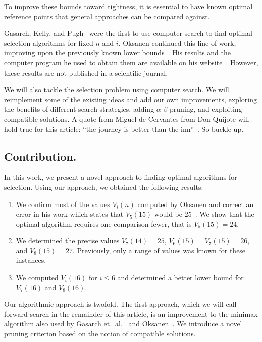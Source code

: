 \documentclass[a4paper,UKenglish,cleveref, autoref, thm-restate]{lipics-v2021}
\begin{document}
To improve these bounds toward tightness, it is essential to have known optimal reference points that general approaches can be compared against.

Gasarch, Kelly, and Pugh~\cite{Gasarch1996} were the first to use computer search to find optimal selection algorithms for fixed $n$ and $i$.
Oksanen continued this line of work, improving upon the previously known lower bounds~\cite{Oksanen2006}.
His results and the computer program he used to obtain them are available on his website~\cite{Oksanen}.
However, these results are not published in a scientific journal.

We will also tackle the selection problem using computer search.
We will reimplement some of the existing ideas and add our own improvements, exploring the benefits of different search strategies, adding $\alpha$-$\beta$-pruning, and exploiting compatible solutions.
A quote from Miguel de Cervantes from Don Quijote will hold true for this article: ``the journey is better than the inn''~\cite{cervantes_don_quijote}.
So buckle up.

\subsection{Contribution.}
In this work, we present a novel approach to finding optimal algorithms for selection.
Using our approach, we obtained the following results:
\begin{enumerate}
  \item We confirm most of the values $V_i(n)$ computed by Oksanen and correct an error in his work which states that $V_5(15)$ would be $25$~\cite{Oksanen}.
        We show that the optimal algorithm requires one comparison fewer, that is $V_5(15) = 24$.
  \item We determined the precise values $V_7(14) = 25$, $V_6(15) = V_7(15) = 26$, and $V_8(15) = 27$.
        Previously, only a range of values was known for these instances.
  \item We computed $V_i(16)$ for $i \leq 6$ and determined a better lower bound for $V_7(16)$ and $V_8(16)$.
\end{enumerate}

Our algorithmic approach is twofold.
The first approach, which we will call forward search in the remainder of this article, is an improvement to the minimax algorithm also used by Gasarch et.\ al\@.~\cite{Gasarch1996} and Oksanen~\cite{Oksanen,Oksanen2006}.
We introduce a novel pruning criterion based on the notion of compatible solutions.
\end{document}
